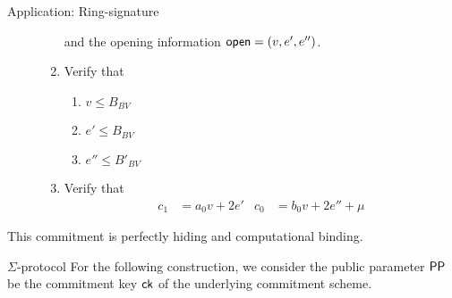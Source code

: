 \begin{section}{Application: Ring-signature}
\begin{description}
\begin{enumerate}
      and the opening information $\mathsf{open} = (v, e', e'')$.
      \item Verify that
      \begin{enumerate}
        \item $v \leq B_{BV}$
        \item $e' \leq B_{BV}$
        \item $e'' \leq B'_{BV}$
      \end{enumerate}
      \item Verify that
      \begin{align*}
        c_1 &= a_0 v + 2e' & c_0 &= b_0v +2 e'' + \mu
      \end{align*}
    \end{enumerate}
  \end{description}

  This commitment is perfectly hiding and computational binding.

  \begin{subsection}{$\Sigma$-protocol}
    For the following construction, we consider the public parameter ${\mathsf{PP}}$ be the commitment key $\mathsf{ck}$ of the underlying commitment scheme.
    \begin{description}



\end{description}
\end{subsection}
\end{section}
